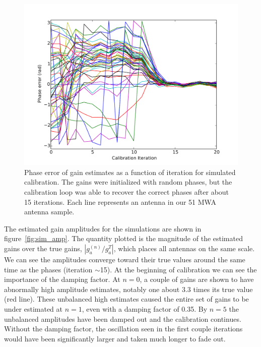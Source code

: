 \documentclass[a4paper,fleqn,usenatbib]{mnras}
\begin{document}
\begin{figure}
\begin{center}
\includegraphics[width=\columnwidth]{fig3.pdf}
\caption{Phase error of gain estimates as a function of iteration for simulated calibration. The 
gains were initialized with random phases, but the calibration loop was able to recover the 
correct phases after about 15 iterations. Each line represents an antenna in our 51 MWA 
antenna sample.
}
\label{fig:sim_phase}
\end{center}
\end{figure}

The estimated gain amplitudes for the simulations are shown in figure~\ref{fig:sim_amp}. The 
quantity plotted is the magnitude of the estimated gains over the true gains, $\left|g^{(n)}_a/
g^T_a\right|$, which places all antennas on the same scale. We can see the amplitudes 
converge toward their true values around the same time as the phases (iteration $\sim$15). At 
the beginning of calibration we can see the importance of the damping factor. At $n=0$, a couple of 
gains are shown to have abnormally high amplitude estimates, notably one about 3.3 times its 
true value (red line). These unbalanced high estimates caused the entire set of gains to be 
under estimated at $n=1$, even with a damping factor of 0.35. By $n=5$ the unbalanced 
amplitudes have been damped out and the calibration continues. Without the damping factor, 
the oscillation seen in the first couple iterations would have been significantly larger and taken 
much longer to fade out. 
\end{document}

